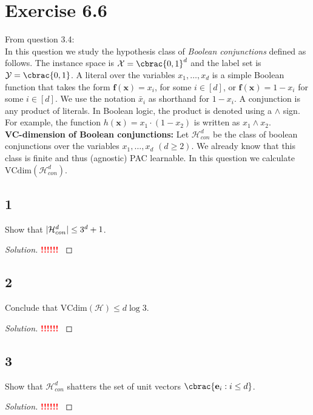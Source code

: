 \documentclass[10pt, a4paper, twoside]{amsart}
\DeclarePairedDelimiter\abs{\lvert}{\rvert}
\DeclarePairedDelimiter\cbrac\{\}
\newcommand{\cH}{\ensuremath{\mathcal{H}}}
\newcommand{\cX}{\ensuremath{\mathcal{X}}}
\newenvironment{solution}
               {\let\oldqedsymbol=\qedsymbol
                \renewcommand{\qedsymbol}{$\blacktriangleleft$}
                \begin{proof}[Solution]}
               {\end{proof}
                \renewcommand{\qedsymbol}{\oldqedsymbol}}
\newcommand{\TODO}{\textcolor{red}{\textbf{!!!!!! }}}
\begin{document}
\section*{Exercise 6.6}
From question 3.4: \\
In this question we study the hypothesis class of \textit{Boolean conjunctions} defined as follows. The instance space is $\cX = \cbrac{0,1}^d$ and the label set is $\mathcal{Y}=\cbrac{0,1}$. A literal over the variables $x_1, \ldots ,x_d$ is a simple Boolean function that takes the form $\mathbf{f}(\mathbf{x}) = x_i$, for some $i \in [d]$, or $\mathbf{f}(\mathbf{x}) = 1-x_i$ for some $i \in [d]$. We use the notation $\bar{x}_i$ as shorthand for $1-x_i$. A conjunction is any product of literals. In Boolean logic, the product is denoted using a $\land$ sign. For example, the function $h(\mathbf{x}) = x_1 \cdot (1-x_2)$ is written as $x_1 \land x_2$.\\
\textbf{VC-dimension of Boolean conjunctions:} Let $\cH^d_{con}$ be the class of boolean conjunctions over the variables $x_1, \ldots , x_d$ $(d \geq 2)$. We already know that this class is finite and thus (agnostic) PAC learnable. In this question we calculate $\text{VCdim}(\cH^d_{con})$.
\subsection*{1}
Show that $\abs{\cH^d_{con}} \leq 3^d + 1$.
\begin{solution}
\TODO
\end{solution}
\subsection*{2}
Conclude that $\text{VCdim}(\cH) \leq d \log 3$.
\begin{solution}
\TODO
\end{solution}
\subsection*{3}
Show that $\cH^d_{con}$ shatters the set of unit vectors $\cbrac{\mathbf{e}_i:i \leq d}$.
\begin{solution}
\TODO
\end{solution}
\end{document}

